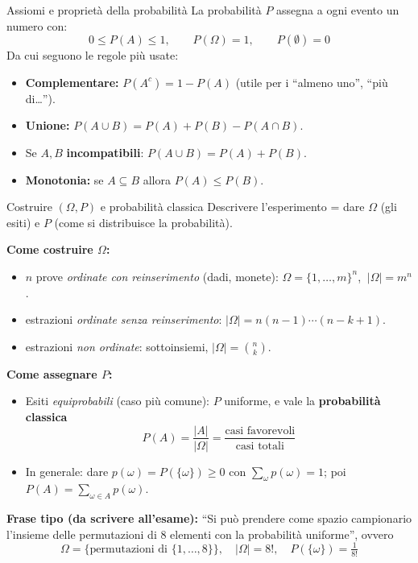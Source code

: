 \documentclass[11pt]{article}
\begin{document}
\begin{concetto}[barSlate]{Assiomi e propriet\`a della probabilit\`a}
La probabilit\`a $P$ assegna a ogni evento un numero con:
\[ 0 \le P(A) \le 1, \qquad P(\Omega) = 1, \qquad P(\emptyset)=0 \]
Da cui seguono le regole pi\`u usate:
\begin{itemize}[leftmargin=1.2em,itemsep=2pt,topsep=2pt]
\item \textbf{Complementare:} $P(A^c) = 1 - P(A)$ \; (utile per i ``almeno uno'', ``pi\`u di\dots'').
\item \textbf{Unione:} $P(A \cup B) = P(A) + P(B) - P(A \cap B)$.
\item Se $A, B$ \textbf{incompatibili}: $P(A \cup B) = P(A) + P(B)$.
\item \textbf{Monotonia:} se $A \subseteq B$ allora $P(A) \le P(B)$.
\end{itemize}
\end{concetto}

\begin{concetto}[barSlate]{Costruire $(\Omega, P)$ e probabilit\`a classica}
Descrivere l'esperimento = dare $\Omega$ (gli esiti) e $P$ (come si distribuisce la probabilit\`a).

\textbf{Come costruire $\Omega$:}
\begin{itemize}[leftmargin=1.2em,itemsep=2pt,topsep=2pt]
\item $n$ prove \emph{ordinate con reinserimento} (dadi, monete): $\Omega = \{1,\dots,m\}^n$, $\ |\Omega| = m^n$.
\item estrazioni \emph{ordinate senza reinserimento}: $|\Omega| = n(n-1)\cdots(n-k+1)$.
\item estrazioni \emph{non ordinate}: sottoinsiemi, $|\Omega| = \binom{n}{k}$.
\end{itemize}

\textbf{Come assegnare $P$:}
\begin{itemize}[leftmargin=1.2em,itemsep=2pt,topsep=2pt]
\item Esiti \emph{equiprobabili} (caso pi\`u comune): $P$ uniforme, e vale la \textbf{probabilit\`a classica}
\[ P(A) = \frac{|A|}{|\Omega|} = \frac{\text{casi favorevoli}}{\text{casi totali}} \]
\item In generale: dare $p(\omega)=P(\{\omega\}) \ge 0$ con $\sum_{\omega} p(\omega)=1$; poi $P(A)=\sum_{\omega \in A} p(\omega)$.
\end{itemize}

\textbf{Frase tipo (da scrivere all'esame):} ``Si pu\`o prendere come spazio campionario l'insieme delle permutazioni di $8$ elementi con la probabilit\`a uniforme'', ovvero
\[ \Omega = \{\text{permutazioni di } \{1,\dots,8\}\}, \quad |\Omega| = 8!, \quad P(\{\omega\}) = \tfrac{1}{8!} \]
\end{concetto}
\end{document}
